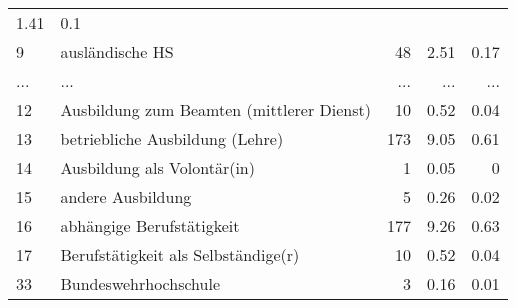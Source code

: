 \begin{longtable}{lXrrr}
          \num[round-mode=places,round-precision=2]{1,41} &
          \num[round-mode=places,round-precision=2]{0,1} \\
        9 & \multicolumn{1}{X}{ausländische HS} & %
          \num{48} &
          \num[round-mode=places,round-precision=2]{2,51} &
          \num[round-mode=places,round-precision=2]{0,17} \\
       ... & ... & ... & ... & ... \\
        12 & \multicolumn{1}{X}{Ausbildung zum Beamten (mittlerer Dienst)} & %
          \num{10} &
          \num[round-mode=places,round-precision=2]{0,52} &
          \num[round-mode=places,round-precision=2]{0,04} \\

        13 & \multicolumn{1}{X}{betriebliche Ausbildung (Lehre)} & %
          \num{173} &
          \num[round-mode=places,round-precision=2]{9,05} &
          \num[round-mode=places,round-precision=2]{0,61} \\

        14 & \multicolumn{1}{X}{Ausbildung als Volontär(in)} & %
          \num{1} &
          \num[round-mode=places,round-precision=2]{0,05} &
          \num[round-mode=places,round-precision=2]{0} \\

        15 & \multicolumn{1}{X}{andere Ausbildung} & %
          \num{5} &
          \num[round-mode=places,round-precision=2]{0,26} &
          \num[round-mode=places,round-precision=2]{0,02} \\

        16 & \multicolumn{1}{X}{abhängige Berufstätigkeit} & %
          \num{177} &
          \num[round-mode=places,round-precision=2]{9,26} &
          \num[round-mode=places,round-precision=2]{0,63} \\

        17 & \multicolumn{1}{X}{Berufstätigkeit als Selbständige(r)} & %
          \num{10} &
          \num[round-mode=places,round-precision=2]{0,52} &
          \num[round-mode=places,round-precision=2]{0,04} \\

        33 & \multicolumn{1}{X}{Bundeswehrhochschule} & %
          \num{3} &
          \num[round-mode=places,round-precision=2]{0,16} &
          \num[round-mode=places,round-precision=2]{0,01} \\


\end{longtable}
